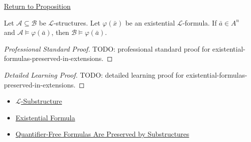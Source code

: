 \newpage
{}
\label{prf:existential-formulas-preserved-in-extensions}

\begin{remark*}[Return]
\hyperref[prop:existential-formulas-preserved-in-extensions]{Return to Proposition}
\end{remark*}

\begin{proposition*}
Let $\mathcal{A}\subseteq\mathcal{B}$ be $\mathcal{L}$-structures. Let
$\varphi(\bar x)$ be an existential $\mathcal{L}$-formula. If
$\bar a\in A^n$ and $\mathcal{A}\models\varphi(\bar a)$, then
$\mathcal{B}\models\varphi(\bar a)$.
\end{proposition*}

\begin{proof}[Professional Standard Proof]
\LRAProofBodyStart
TODO: professional standard proof for existential-formulas-preserved-in-extensions.
\end{proof}

\begin{proof}[Detailed Learning Proof]
\LRAProofBodyStart
TODO: detailed learning proof for existential-formulas-preserved-in-extensions.
\end{proof}

\begin{remark*}
\end{remark*}

\begin{dependencies}
\begin{itemize}
  \item \hyperref[def:l-substructure]{$\mathcal{L}$-Substructure}
  \item \hyperref[def:existential-formula]{Existential Formula}
  \item \hyperref[lem:quantifier-free-formulas-preserved-by-substructures]{Quantifier-Free Formulas Are Preserved by Substructures}
\end{itemize}
\end{dependencies}

\clearpage
